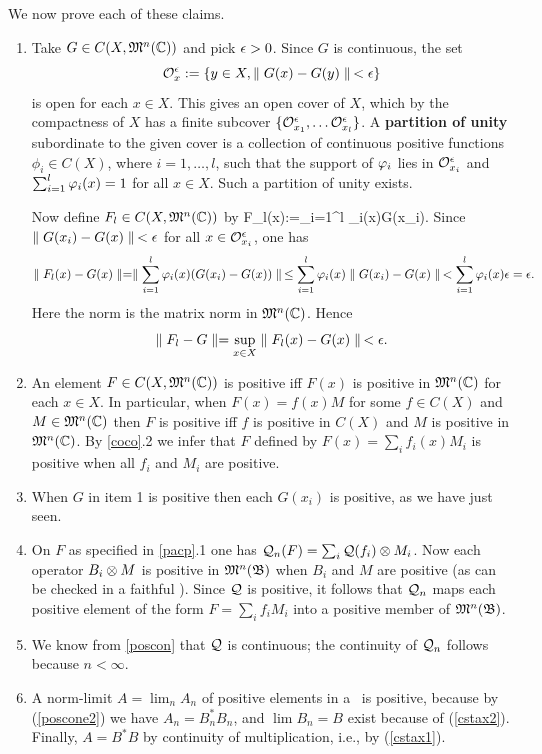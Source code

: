 We now prove each of these claims.
\begin{enumerate}
\item
Take $G\in C(X,{\frak M}^n({\Bbb C}))$ and pick $\epsilon>0$. Since $G$ is continuous,
the set $${\cal O}^{\epsilon}_x:=\{y\in X, \parallel G(x)-G(y)\parallel\,<\epsilon\}$$ is open for
each $x\in X$. This gives an open cover of $X$, which by the
compactness of $X$ has a finite subcover $\{{\cal O}^{\epsilon}_{x_1},\ldots
{\cal O}^{\epsilon}_{x_l}\}$.  A {\bf partition of unity} subordinate to the
given cover is a collection of continuous positive functions
$\phi_i\in C(X)$, where $i=1,\ldots,l$, such that the support of
$\varphi_i$ lies in ${\cal O}^{\epsilon}_{x_i}$ and $\sum_{i=1}^l\varphi_i(x)=1$ for
all $x\in X$.  Such a partition of unity exists.

Now define $F_l\in C(X,{\frak M}^n({\Bbb C}))$ by \be F_l(x):=\sum_{i=1}^l
\phv_i(x)G(x_i).  \ee Since $\parallel G(x_i)-G(x)\parallel\,<\epsilon$ for all $x\in
{\cal O}^{\epsilon}_{x_i}$, one has
$$
\parallel F_l(x)-G(x)\parallel=\parallel \sum_{i=1}^l\varphi_i(x)( G(x_i)-G(x))\parallel \,\leq
\sum_{i=1}^l \varphi_i(x)\parallel G(x_i)-G(x)\parallel\,<\sum_{i=1}^l
\varphi_i(x)\epsilon=\epsilon.$$ Here the norm is the matrix norm in ${\frak M}^n({\Bbb C})$.
Hence $$\parallel F_l-G\parallel=\sup_{x\in X} \parallel F_l(x)-G(x)\parallel\,<\epsilon.$$
\item
An element $F\in C(X,{\frak M}^n({\Bbb C}))$ is positive iff $F(x)$ is positive in
${\frak M}^n({\Bbb C})$ for each $x\in X$. In particular, when $F(x)=f(x)M$ for
some $f\in C(X)$ and $M\in {\frak M}^n({\Bbb C})$ then $F$ is positive iff $f$ is
positive in $C(X)$ and $M$ is positive in ${\frak M}^n({\Bbb C})$. By \ref{coco}.2
we infer that $F$ defined by $F(x)=\sum_i f_i (x)M_i$ is positive when
all $f_i$ and $M_i$ are positive.
\item
When $G$ in item 1 is positive then each $G(x_i)$ is positive, as we
have just seen.
\item
On $F$ as specified in \ref{pacp}.1 one has ${\cal Q}_n(F)=\sum_i
{\cal Q}(f_i)\otimes M_i$. Now each operator $B_i\otimes M$ is positive in
${\frak M}^n({\frak B})$ when $B_i$ and $M$ are positive (as can be checked in a
faithful \rep).  Since ${\cal Q}$ is positive, it follows that ${\cal Q}_n$ maps
each positive element of the form $F=\sum_i f_iM_i$ into a positive
member of ${\frak M}^n({\frak B})$.
\item
We know from \ref{poscon} that ${\cal Q}$ is continuous; the continuity of
${\cal Q}_n$ follows because $n<\infty$.
\item
A norm-limit $A=\lim_n A_n$ of positive elements in a \ca\ is
positive, because by (\ref{poscone2}) we have $A_n=B_n^*B_n$, and
$\lim B_n=B$ exist because of (\ref{cstax2}). Finally, $A=B^*B$ by
continuity of multiplication, i.e., by (\ref{cstax1}).
\end{enumerate}\enp
